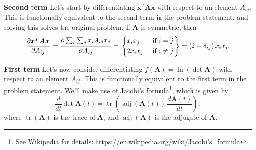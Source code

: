 \documentclass[12pt, a4paper]{article}
\newcommand{\vect}[1]{\bm{#1}}
\begin{document}
{\begin{easylist}[enumerate]
\textbf{Second term}
Let's start by differentiating $\vect{x}^T \vect{A} \vect{x}$ with respect to an element $A_{ij}$.
This is functionally equivalent to the second term in the problem statement, and solving this solves the original problem.
If $\vect{A}$ is symmetric, then
\begin{equation*}
	\frac{\partial \vect{x}^T \vect{A} \vect{x}}{\partial A_{ij}}
	=
	\frac{\partial \sum_i \sum_j x_i A_{ij} x_j}{\partial A_{ij}}
	=
	\begin{rcases}
		\begin{dcases}
		x_i x_j & \text{ if } i = j \\
		2x_i x_j & \text{ if } i \neq j
		\end{dcases}
	\end{rcases}
	= \left(2 - \delta_{ij}\right) x_i x_j.
\end{equation*}

\textbf{First term}
Let's now consider differentiating $f(\vect{A}) = \ln \left( \det \vect{A} \right)$ with respect to an element $A_{ij}$.
This is functionally equivalent to the first term in the problem statement.
We'll make use of Jacobi's formula\footnote{See Wikipedia for details: \url{https://en.wikipedia.org/wiki/Jacobi's_formula}}, which is given by
\begin{equation*}
	\frac{d}{dt} \det \vect{A}(t) = \operatorname{tr} \left (\operatorname{adj}(\vect{A}(t)) \, \frac{d\vect{A}(t)}{dt}\right ),
\end{equation*}
where $\operatorname{tr}(\vect{A})$ is the trace of $\vect{A}$, and $\operatorname{adj}(\vect{A})$ is the adjugate of $\vect{A}$.


\end{easylist}}
\end{document}
